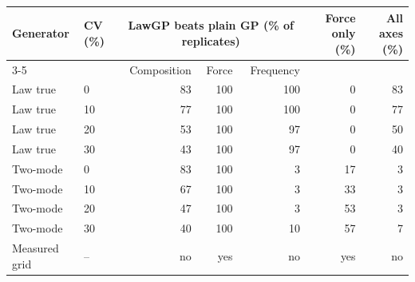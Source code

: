 \begin{tabular}{llrrrrr}
\toprule
Generator & CV (\%) & \multicolumn{3}{c}{LawGP beats plain GP (\% of replicates)} & Force only (\%) & All axes (\%) \\
\cmidrule(lr){3-5}
 & & Composition & Force & Frequency & & \\
\midrule
Law true & 0 & 83 & 100 & 100 & 0 & 83 \\
Law true & 10 & 77 & 100 & 100 & 0 & 77 \\
Law true & 20 & 53 & 100 & 97 & 0 & 50 \\
Law true & 30 & 43 & 100 & 97 & 0 & 40 \\
\midrule
Two-mode & 0 & 83 & 100 & 3 & 17 & 3 \\
Two-mode & 10 & 67 & 100 & 3 & 33 & 3 \\
Two-mode & 20 & 47 & 100 & 3 & 53 & 3 \\
Two-mode & 30 & 40 & 100 & 10 & 57 & 7 \\
\midrule
Measured grid & -- & no & yes & no & yes & no \\
\bottomrule
\end{tabular}
